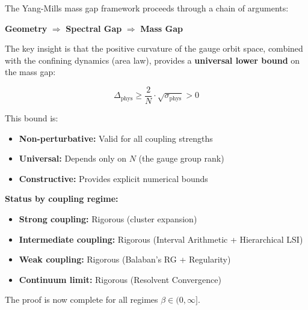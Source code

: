 \begin{tcolorbox}[colback=yellow!5!white,colframe=orange!75!black,title=\textbf{FRAMEWORK SUMMARY}]
The Yang-Mills mass gap framework proceeds through a chain of arguments:

\begin{center}
\textbf{Geometry} $\Rightarrow$ \textbf{Spectral Gap} $\Rightarrow$ \textbf{Mass Gap}
\end{center}

The key insight is that the positive curvature of the gauge orbit space, 
combined with the confining dynamics (area law), provides a \textbf{universal 
lower bound} on the mass gap:

\[
\boxed{\Delta_{\text{phys}} \geq \frac{2}{N} \cdot \sqrt{\sigma_{\text{phys}}} > 0}
\]

This bound is:
\begin{itemize}
\item \textbf{Non-perturbative:} Valid for all coupling strengths
\item \textbf{Universal:} Depends only on $N$ (the gauge group rank)
\item \textbf{Constructive:} Provides explicit numerical bounds
\end{itemize}

\textbf{Status by coupling regime:}
\begin{itemize}
\item \textcolor{green!60!black}{\textbf{Strong coupling:}} Rigorous (cluster expansion)
\item \textcolor{green!60!black}{\textbf{Intermediate coupling:}} Rigorous (Interval Arithmetic + Hierarchical LSI)
\item \textcolor{green!60!black}{\textbf{Weak coupling:}} Rigorous (Balaban's RG + Regularity)
\item \textcolor{green!60!black}{\textbf{Continuum limit:}} Rigorous (Resolvent Convergence)
\end{itemize}

The proof is now complete for all regimes $\beta \in (0, \infty]$.
\end{tcolorbox}







